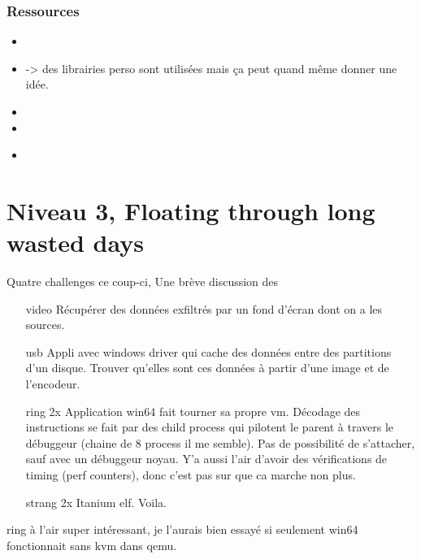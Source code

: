 \documentclass[14pt]{article}
\let\oldinputminted\inputminted
\renewcommand{\inputminted}[2]{\begin{tcolorbox}\oldinputminted[breaklines]{#1}{#2}\end{tcolorbox}}
\begin{document}
\subsubsection{Ressources}
\begin{itemize}
\item {}
\item {} -> des librairies perso sont utilisées mais ça peut quand même donner une idée.
\item {}
\item {}
\item {}
\inputminted{go}{./challs/part2/huge/archive/tar/test.go}
\end{itemize}


\section{Niveau 3, Floating through long wasted days}

Quatre challenges ce coup-ci, Une brève discussion des
\begin{itemize}
\item[video] Récupérer des données exfiltrés par un fond d'écran dont on a les sources.
\item[usb] Appli avec windows driver qui cache des données entre des partitions d'un disque. Trouver qu'elles sont ces données à partir d'une image et de l'encodeur.
\item[ring 2x] Application win64 fait tourner sa propre vm. Décodage des instructions se fait par des child process qui pilotent le parent à travers le débuggeur (chaine de 8 process il me semble). Pas de possibilité de s'attacher, sauf avec un débuggeur noyau. Y'a aussi l'air d'avoir des vérifications de timing (perf counters), donc c'est pas sur que ca marche non plus.
\item[strang 2x] Itanium elf. Voila.
\end{itemize}

ring à l'air super intéressant, je l'aurais bien essayé si seulement win64 fonctionnait sans kvm dans qemu.
\end{document}
